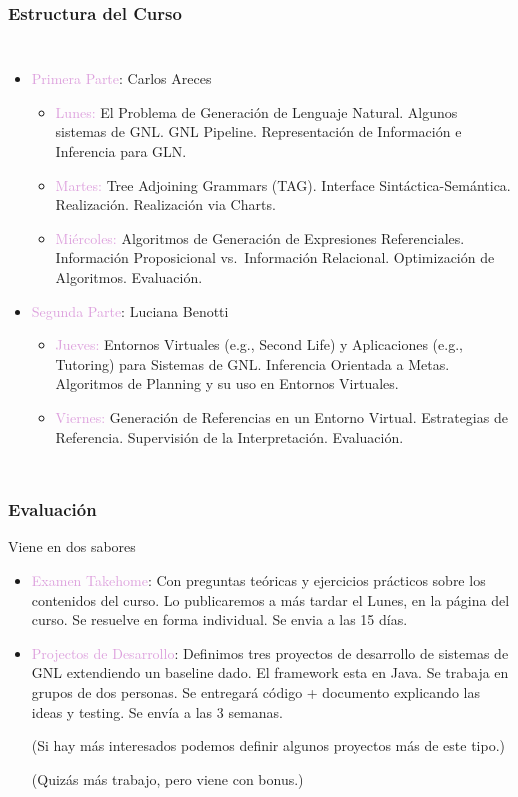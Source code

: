 \documentclass[compress,color=usenames]{beamer}
\newcommand{\mH}[1]{\textcolor{Plum}{#1}}
\begin{document}
\begin{frame}
\frametitle{Estructura del Curso}

\begin{columns}
\begin{itemize}
\item \mH{Primera Parte}: Carlos Areces
\begin{itemize}
\item \mH{Lunes:} El Problema de Generaci\'on de Lenguaje Natural. Algunos sistemas de GNL.  GNL Pipeline. Representaci\'on de Informaci\'on e Inferencia para GLN.\pause

\item \mH{Martes:} Tree Adjoining Grammars (TAG). Interface Sint\'actica-Sem\'antica.
Realizaci\'on. Realizaci\'on via Charts. \pause

\item \mH{Mi\'ercoles:} Algoritmos de Generaci\'on de Expresiones Referenciales. Informaci\'on Proposicional vs.\ Informaci\'on Relacional. Optimizaci\'on de Algoritmos. Evaluaci\'on.\pause
\end{itemize}

\item \mH{Segunda Parte}: Luciana Benotti

\begin{itemize}
\item \mH{Jueves:} Entornos Virtuales (e.g., Second Life) y Aplicaciones (e.g., Tutoring) para Sistemas de GNL. Inferencia Orientada a Metas. Algoritmos de Planning y su uso en Entornos Virtuales.\pause

\item \mH{Viernes:} Generaci\'on de Referencias en un Entorno Virtual. Estrategias de Referencia. Supervisi\'on de la Interpretaci\'on. Evaluaci\'on.
\end{itemize}
\end{itemize}
\end{columns}
\end{frame}

\begin{frame}
\frametitle{Evaluaci\'on}

Viene en dos sabores

\begin{itemize}
\item \mH{Examen Takehome}:  Con preguntas te\'oricas y ejercicios pr\'acticos sobre los contenidos del curso. 
  Lo publicaremos a m\'as tardar el Lunes, en la p\'agina del curso.  Se resuelve en forma individual.  
  Se envia a las 15 d\'ias.   

\item \mH{Projectos de Desarrollo}: Definimos tres proyectos de desarrollo de sistemas de GNL extendiendo un baseline dado.  El framework esta en Java.  Se trabaja en grupos de dos personas. Se entregar\'a c\'odigo + documento explicando las ideas y testing. 
Se env\'ia a las 3 semanas.  

(Si hay m\'as interesados podemos definir algunos proyectos m\'as de este tipo.)

(Quiz\'as m\'as trabajo, pero viene con bonus.)
\end{itemize}
\end{frame}
\end{document}
